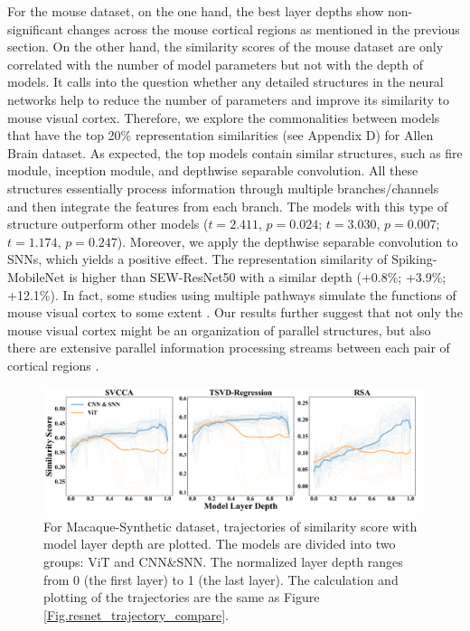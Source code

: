 \documentclass[letterpaper]{article} %
\begin{document}
For the mouse dataset, on the one hand, the best layer depths show non-significant changes across the mouse cortical regions as mentioned in the previous section. On the other hand, the similarity scores of the mouse dataset are only correlated with the number of model parameters but not with the depth of models. It calls into the question whether any detailed structures in the neural networks help to reduce the number of parameters and improve its similarity to mouse visual cortex. Therefore, we explore the commonalities between models that have the top 20\% representation similarities (see Appendix D) for Allen Brain dataset. As expected, the top models contain similar structures, such as fire module, inception module, and depthwise separable convolution. All these structures essentially process information through multiple branches/channels and then integrate the features from each branch. The models with this type of structure outperform other models ($t=2.411$, $p=0.024$; $t=3.030$, $p=0.007$; $t=1.174$, $p=0.247$). Moreover, we apply the depthwise separable convolution to SNNs, which yields a positive effect. The representation similarity of Spiking-MobileNet is higher than SEW-ResNet50 with a similar depth (+0.8\%; +3.9\%; +12.1\%). In fact, some studies using multiple pathways simulate the functions of mouse visual cortex to some extent \cite{shi2022mousenet, nayebi2022mouse}. Our results further suggest that not only the mouse visual cortex might be an organization of parallel structures, but also there are extensive parallel information processing streams between each pair of cortical regions \cite{wang2012network, siegle2021survey}.

\begin{figure}[t]
\centering
\includegraphics[width=0.99\textwidth]{figs/trajectory_compare_macaque_synthetic_nv.pdf}
\caption{For Macaque-Synthetic dataset, trajectories of similarity score with model layer depth are plotted. The models are divided into two groups: ViT and CNN\&SNN. The normalized layer depth ranges from 0 (the first layer) to 1 (the last layer). The calculation and plotting of the trajectories are the same as Figure \ref{Fig.resnet_trajectory_compare}.}
\label{Fig.trajectory_compare}
\end{figure}
\end{document}
